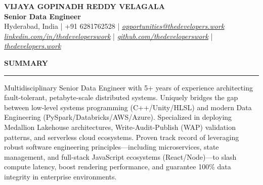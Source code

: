 \documentclass[10pt, letterpaper]{article}
\newcommand{\resumesection}[1]{
  \vspace{8pt}
  \noindent \textbf{\large \uppercase{#1}} \\
  \vspace{-8pt}
  \hrule
  \vspace{6pt}
}
\begin{document}
\pagestyle{empty}

\begin{center}
    {\LARGE \textbf{VIJAYA GOPINADH REDDY VELAGALA}} \\
    \vspace{2pt}
    \textsf{\textbf{Senior Data Engineer}} \\
    \vspace{4pt}
    Hyderabad, India | +91 6281762528 | \href{mailto:opportunities@thedevelopers.work}{\textit{\underline{opportunities@thedevelopers.work}}} \\
    \href{https://linkedin.com/in/thedeveloperswork}{\textit{\underline{linkedin.com/in/thedeveloperswork}}} | \href{https://github.com/thedeveloperswork}{\textit{\underline{github.com/thedeveloperswork}}} | \href{https://thedevelopers.work}{\textit{\underline{thedevelopers.work}}}
\end{center}

\resumesection{Summary}
\noindent Multidisciplinary Senior Data Engineer with 5+ years of experience architecting fault-tolerant, petabyte-scale distributed systems. Uniquely bridges the gap between low-level systems programming (C++/Unity/HLSL) and modern Data Engineering (PySpark/Databricks/AWS/Azure). Specialized in deploying Medallion Lakehouse architectures, Write-Audit-Publish (WAP) validation patterns, and serverless cloud ecosystems. Proven track record of leveraging robust software engineering principles—including microservices, state management, and full-stack JavaScript ecosystems (React/Node)—to slash compute latency, boost rendering performance, and guarantee 100\% data integrity in enterprise environments.
\end{document}
